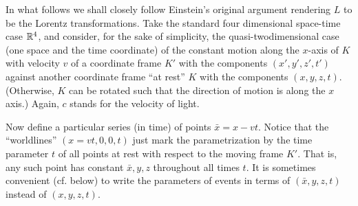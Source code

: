 In what follows we shall closely follow Einstein's original argument
rendering $L$ to be the Lorentz transformations.
Take the standard four dimensional space-time case ${\Bbb R}^4$, and
consider, for the sake of simplicity,  the
quasi-twodimensional case (one space and the time coordinate)
of the constant motion along the $x$-axis of $K$
with velocity $v$ of a coordinate frame
$K'$ with the components $(x',y',z',t')$
against another coordinate frame ``at rest''
$K$ with the components $(x,y,z,t)$.
(Otherwise, $K$ can be
rotated such that the direction of motion is along the $x$ axis.)
Again, $c$ stands for the velocity of light.

Now define a particular series (in time) of points $\bar{x}=x-vt$.
Notice that the ``worldlines'' $(x=vt,0,0,t)$ just mark the
parametrization by the time parameter $t$
of all points at rest with respect to the moving frame $K'$.
That is, any such point has constant $\bar{x},y,z$ throughout all times
$t$.
It is sometimes convenient (cf. below) to
write the parameters of events in terms of
$(\bar{x},y,z,t)$
instead of
$(x,y,z,t)$.

